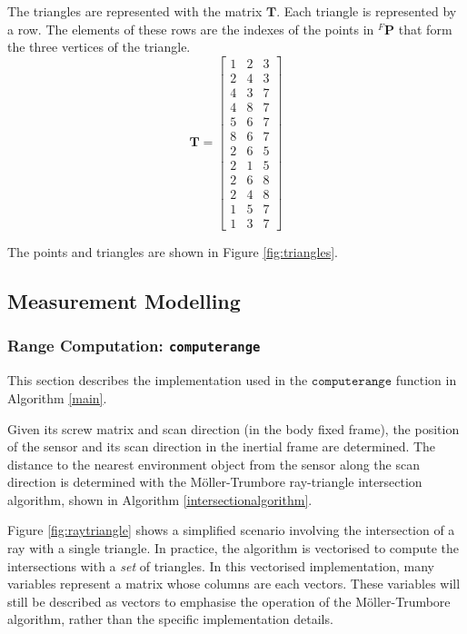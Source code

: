 The triangles are represented with the matrix $\mathbf{T}$. Each triangle is represented by a row. The elements of these rows are the indexes of the points in ${^{F}\mathbf{P}}$ that form the three vertices of the triangle.
\begin{equation}
	\mathbf{T} = 
	\begin{bmatrix}
	1 & 2 & 3 \\
	2 & 4 & 3 \\
    4 & 3 & 7 \\
    4 & 8 & 7 \\
    5 & 6 & 7 \\
    8 & 6 & 7 \\
    2 & 6 & 5 \\
    2 & 1 & 5 \\
    2 & 6 & 8 \\
    2 & 4 & 8 \\
    1 & 5 & 7 \\
    1 & 3 & 7
	\end{bmatrix}
\end{equation}

The points and triangles are shown in Figure \ref{fig:triangles}.


\subsection{Measurement Modelling}
	\subsubsection{Range Computation: \texttt{computerange}}
	This section describes the implementation used in the $\texttt{computerange}$ function in Algorithm \ref{main}.
	
	Given its screw matrix and scan direction (in the body fixed frame), the position of the sensor and its scan direction in the inertial frame are determined.
	The distance to the nearest environment object from the sensor along the scan direction is determined with the M{\"o}ller-Trumbore ray-triangle intersection algorithm, shown in Algorithm \ref{intersectionalgorithm}.
	
	Figure \ref{fig:raytriangle} shows a simplified scenario involving the intersection of a ray with a single triangle. In practice, the algorithm is vectorised to compute the intersections with a \textit{set} of triangles. In this vectorised implementation, many variables represent a matrix whose columns are each vectors. These variables will still be described as vectors to emphasise the operation of the M{\"o}ller-Trumbore algorithm, rather than the specific implementation details.	
	
